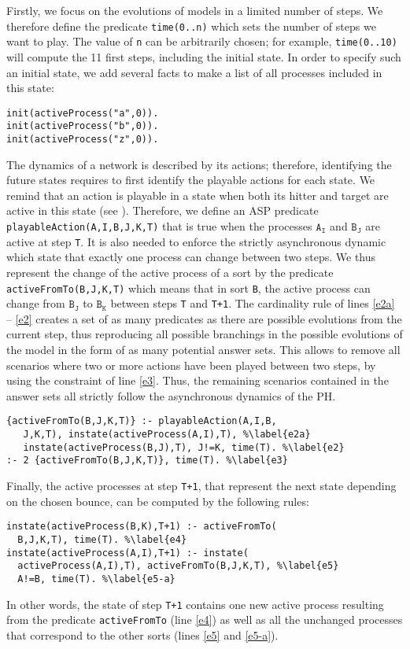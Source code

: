 Firstly, we focus on the evolutions of models in a limited number of steps.
We therefore define the predicate \texttt{time(0..n)} which sets the number of steps we want to play.
The value of \texttt{n} can be arbitrarily chosen;
for example, \texttt{time(0..10)} will compute the 11 first steps,
including the initial state.
In order to specify such an initial state, we add several facts
to make a list of all processes included in this state:
\begin{lstlisting}
init(activeProcess("a",0)). 
init(activeProcess("b",0)).
init(activeProcess("z",0)).
\end{lstlisting}
The dynamics of a network is described by its actions;
therefore, identifying the future states requires to first identify the playable actions for each state.
We remind that an action is playable in a state when both its hitter and target are active in this state (see ).
Therefore, we define an ASP predicate \texttt{playableAction(A,I,B,J,K,T)} that is true
when the processes $\texttt{A}_\texttt{I}$ and $\texttt{B}_\texttt{J}$ are active at step \texttt{T}.
It is also needed to enforce the strictly asynchronous dynamic
which state that exactly one process can change between two steps.
We thus represent the change of the active process of a sort
by the predicate \texttt{activeFromTo(B,J,K,T)}
which means that in sort \texttt{B}, the active process can change from $\texttt{B}_\texttt{J}$ to $\texttt{B}_\texttt{K}$ between steps \texttt{T} and \texttt{T+1}.
The cardinality rule of lines \ref{e2a} -- \ref{e2}
creates a set of as many predicates as there are possible evolutions from the current step,
thus reproducing all possible branchings in the possible evolutions of the model in the form of as many potential answer sets.
This allows to remove all scenarios where two or more actions have been played between
two steps, by using the constraint of line \ref{e3}.
Thus, the remaining scenarios contained in the answer sets all strictly follow
the asynchronous dynamics of the PH.
\begin{lstlisting}
{activeFromTo(B,J,K,T)} :- playableAction(A,I,B,
   J,K,T), instate(activeProcess(A,I),T), %\label{e2a} 
   instate(activeProcess(B,J),T), J!=K, time(T). %\label{e2}
:- 2 {activeFromTo(B,J,K,T)}, time(T). %\label{e3}
\end{lstlisting}

Finally, the active processes at step \texttt{T+1},
that represent the next state depending on the chosen bounce,
can be computed by the following rules:
\begin{lstlisting}
instate(activeProcess(B,K),T+1) :- activeFromTo(
  B,J,K,T), time(T). %\label{e4}
instate(activeProcess(A,I),T+1) :- instate(
  activeProcess(A,I),T), activeFromTo(B,J,K,T), %\label{e5}
  A!=B, time(T). %\label{e5-a}
\end{lstlisting}
In other words, the state of step \texttt{T+1} contains one new active process
resulting from the predicate \texttt{activeFromTo} (line \ref{e4})
as well as all the unchanged processes that correspond to the other sorts (lines \ref{e5} and \ref{e5-a}).

